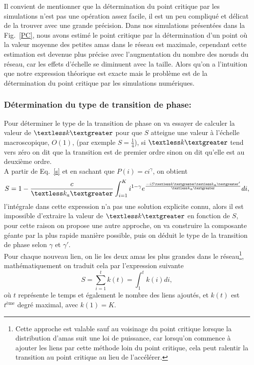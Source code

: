 Il convient de mentionner que la détermination du point critique par les simulations n'est pas une opération assez facile, il est un peu compliqué et délicat de la trouver avec une grande précision. Dans nos simulations présentées dans la Fig.~\ref{PC}, nous avons estimé le point critique par la détermination d'un point où la valeur moyenne des petites amas dans le réseau est maximale,  cependant cette estimation est devenue plus précise avec l'augmentation du nombre des nœuds du réseau, car les effets d'échelle se diminuent avec la taille. Alors qu'on a l'intuition que notre expression théorique est exacte mais le problème est de la détermination du point critique par les simulations numériques. 
 
 
  \subsubsection{Détermination du type de transition de phase:}
 Pour déterminer le type de la transition de phase on va essayer de calculer la valeur de $\km$ pour que $S$ atteigne une valeur à l'échelle macroscopique, $O(1)$, (par exemple $S=\frac{1}{4}$), si $\km$ tend vers zéro on dit que la transition est de premier ordre sinon on dit qu'elle est au deuxième ordre.\\
 A partir de Eq.~\eqref{s} et en sachant que $P(i)=ci^{\gamma}$, on obtient
 \begin{equation}
 S=1-\frac{c}{\kma}\int_{i=1}^Ki^{1-\gamma}e^{\frac{-iS\km\kma'}{\kma}}di
 \label{s2},
 \end{equation}
 l'intégrale dans cette expression n'a pas une solution explicite connu, alors il est impossible d'extraire la valeur de $\km$ en fonction de $S$,  pour cette raison on propose une autre approche, on va construire la composante géante par la plus rapide manière possible, puis on déduit le type de la transition de phase selon $\gamma$ et $\gamma'$.\\
 Pour chaque nouveau lien, on lie les deux amas les plus grandes dans le réseau\footnote{Cette approche est valable sauf au voisinage du point critique lorsque la distribution d'amas suit une loi de puissance, car lorsqu'on commence à ajouter les liens par cette méthode loin du point critique, cela peut ralentir  la transition au point critique au lieu de l'accélérer.}, mathématiquement on traduit cela par l'expression suivante 
  \begin{equation}
  S=\sum_{i=1}^tk(t)=\int_{1}^{t}k(i)di,
  \label{s3}
  \end{equation}
  où $t$ représente le temps et également le nombre des liens ajoutés, et $k(t)$ est $t^{\text{ème}}$ degré maximal, avec $k(1)=K$.\\
